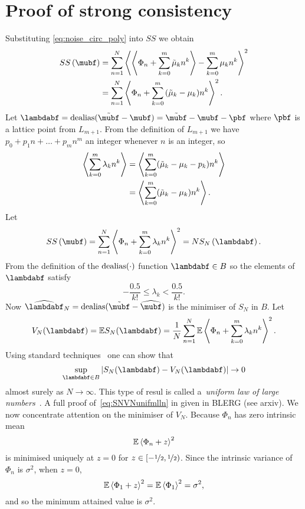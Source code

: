 \documentclass[journal]{IEEEtran}
\begin{document}
\section{Proof of strong consistency}\label{sec:strongconstproof}
 Substituting \eqref{eq:noise_circ_poly} into $SS$ we obtain
 \begin{align*}
SS\left( \mubf \right) &= \sum_{n=1}^{N}\fracpart{ \fracpart{ \Phi_n + \sum_{k = 0}^{m}{\tilde{\mu}_k n^k} } - \sum_{k = 0}^{m}{\mu_k n^k} }^{2} \\
&= \sum_{n=1}^{N}\fracpart{  \Phi_n + \sum_{k = 0}^{m}{(\tilde{\mu}_k - \mu_k) n^k} }^{2}.
\end{align*}
Let $\lambdabf = \dealias(\tilde{\mubf} - \mubf) = \tilde{\mubf} - \mubf - \pbf$ where $\pbf$ is a lattice point from $L_{m+1}$. From the definition of $L_{m+1}$ we have $p_0 + p_1 n + \dots + p_{m} n^m$ an integer whenever $n$ is an integer, so
\begin{align*}
\left\langle \sum_{k=0}^{m}\lambda_k n^k  \right\rangle &= \left\langle \sum_{k=0}^{m}(\tilde{\mu}_k - \mu_k - p_k) n^k  \right\rangle \\
&= \left\langle \sum_{k=0}^{m}(\tilde{\mu}_k - \mu_k) n^k  \right\rangle.
\end{align*}
Let
\[
SS\left( \mubf \right) = \sum_{n=1}^{N}\fracpart{  \Phi_n + \sum_{k = 0}^{m}{\lambda_k n^k} }  ^{2} = N S_{N}\left( \lambdabf \right).
 \]
From the definition of the $\operatorname{dealias}(\cdot)$ function $\lambdabf \in B$ so the elements of $\lambdabf$ satisfy
 \begin{equation} \label{eq:identifiability}
 -\frac{0.5}{k!} \leq \lambda_k < \frac{0.5}{k!}.
 \end{equation} 
Now $\widehat{\lambdabf}_N = \dealias(\tilde{\mubf} - \widehat{\mubf})$ is the minimiser of $S_{N}$ in $B$.  %
Let
\[
V_N(\lambdabf) =  \expect S_N(\lambdabf) = \frac{1}{N}\sum_{n=1}^{N} \expect \fracpart{  \Phi_{n}+\sum_{k = 0}^{m}{\lambda_k n^k}}  ^{2}.
\]
Using standard techniques~\cite{Pollard_conv_stat_proc_1984,van2009empirical} one can show that
 \begin{equation}\label{eq:SNVNunifmlln}
\sup_{\lambdabf \in B}\sabs{S_N(\lambdabf) - V_N(\lambdabf)} \rightarrow 0  
 \end{equation}
almost surely as $N\rightarrow\infty$.  This type of resul is called a~\emph{uniform law of large numbers}~\cite{Pollard_conv_stat_proc_1984,van2009empirical}.  A full proof of~\eqref{eq:SNVNunifmlln} in given in BLERG (see arxiv).  We now concentrate attention on the minimiser of $V_N$. Because $\Phi_n$ has zero intrinsic mean 
\begin{equation}\label{eq:Efracpartmined}
{\mathbb E} \left\langle  \Phi_n + z  \right\rangle^{2}
\end{equation}
is minimised uniquely at $z = 0$ for $z \in [-\nicefrac{1}{2}, \nicefrac{1}{2})$.  Since the intrinsic variance of $\Phi_n$ is $\sigma^2$, when $z = 0$,
\begin{equation}\label{eq:Efracpartphi}
{\mathbb E}\left\langle \Phi_1+z \right\rangle^{2} = {\mathbb E}\left\langle \Phi_1 \right\rangle^{2} = \sigma^2,
\end{equation}
and so the minimum attained value is $\sigma^2$.
\end{document}
